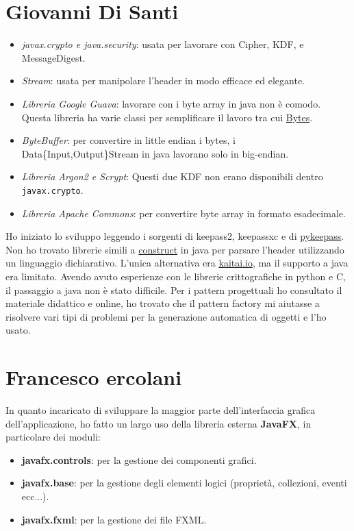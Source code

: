 \documentclass[a4paper,12pt]{report}
\begin{document}
\section*{Giovanni Di Santi}

\begin{itemize}
  \item \textit{javax.crypto e java.security}: usata per lavorare con Cipher, KDF, e MessageDigest.
  \item \textit{Stream}: usata per manipolare l'header in modo efficace ed elegante.
  \item \textit{Libreria Google Guava}: lavorare con i byte array in java non è comodo. Questa libreria ha varie classi per semplificare
    il lavoro tra cui \href{https://guava.dev/releases/19.0/api/docs/com/google/common/primitives/Bytes.html}{Bytes}.
  \item \textit{ByteBuffer}: per convertire in little endian i bytes, i Data\{Input,Output\}Stream in java lavorano solo in big-endian.
  \item \textit{Libreria Argon2 e Scrypt}: Questi due KDF non erano disponibili dentro \texttt{javax.crypto}.
  \item \textit{Libreria Apache Commons}: per convertire byte array in formato esadecimale.
\end{itemize}

Ho iniziato lo sviluppo leggendo i sorgenti di keepass2, keepassxc e di \href{https://github.com/libkeepass/pykeepass}{pykeepass}.
Non ho trovato librerie simili a \href{https://construct.readthedocs.io/en/latest/index.html}{construct} in
java per parsare l'header utilizzando un linguaggio dichiarativo. L'unica alternativa
era \href{http://kaitai.io/}{kaitai.io}, ma il supporto a java era limitato.
Avendo avuto esperienze con le librerie crittografiche in python e C,
il passaggio a java non è stato difficile.
Per i pattern progettuali ho consultato il materiale didattico e online, ho trovato
che il pattern factory mi aiutasse a risolvere vari tipi di problemi per la generazione
automatica di oggetti e l'ho usato.

\section*{Francesco ercolani}
In quanto incaricato di sviluppare la maggior parte dell'interfaccia grafica dell'applicazione, ho fatto un largo uso della libreria esterna \textbf{JavaFX}, in particolare dei moduli:
\begin{itemize}
    \item \textbf{javafx.controls}: per la gestione dei componenti grafici.
    \item \textbf{javafx.base}: per la gestione degli elementi logici (proprietà, collezioni, eventi ecc...).
    \item \textbf{javafx.fxml}: per la gestione dei file FXML.
\end{itemize}
\end{document}
